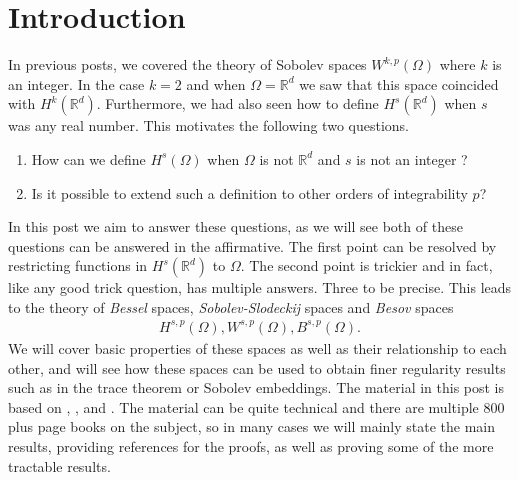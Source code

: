 \documentclass[
    a4paper,
    DIV=14,
    abstract=true,
    numbers=noenddot
]
{scrartcl}
\theoremstyle{definition}
\newcommand{\R}{\mathbb{R}}
\begin{document}
\section{Introduction}
In previous posts, we covered the theory of Sobolev spaces $W^{k,p}(\Omega )$ where $k$ is an integer. In the case $k=2$ and when $\Omega =\R^d$ we saw that this space coincided with $H^k(\R^d)$. Furthermore, we had also seen how to define $H^s(\R^d)$ when $s$ was any real number. This motivates the following two questions.
\begin{enumerate}
    \item How can we define $H^s(\Omega )$  when $\Omega $ is not $\R^d$ and $s$ is not an integer ?
    \item Is it possible to extend such a definition to other orders of integrability $p$?
\end{enumerate}
In this post we aim to answer these questions, as we will see both of these questions can be answered in the affirmative. The first point can be resolved by restricting functions in $H^s(\R^d)$ to $\Omega $. The second point is trickier and in fact, like any good trick question, has multiple answers. Three to be precise. This leads to the theory of \emph{Bessel} spaces, \emph{Sobolev-Slodeckij} spaces and \emph{Besov} spaces
\begin{align*}
    H^{s,p}(\Omega ),W^{s,p}(\Omega ),B^{s,p}(\Omega ).
\end{align*}
We will cover basic properties of these spaces as well as their relationship to each other, and will see how these spaces can be used to obtain finer regularity results such as in the trace theorem or Sobolev embeddings. The material in this post is based on \cite{agranovich2015sobolev}, \cite{di2012hitchhiker's}, \cite{triebel1992theory} and \cite{stein1970singular}. The material can be quite technical and there are multiple $800$ plus page books on the subject, so in many cases we will mainly state the main results, providing references for the proofs, as well as proving some of the more tractable results.
\end{document}
